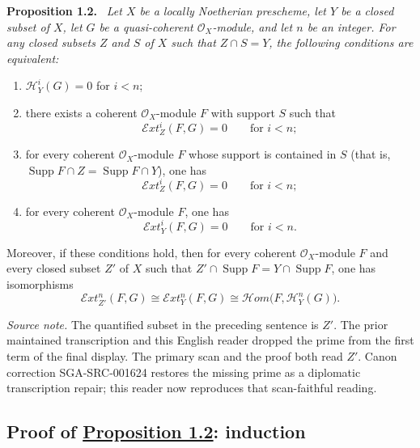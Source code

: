 \documentclass[11pt,a4paper,oneside]{book}
\providecommand{\SheafH}{\mathcal H}
\providecommand{\SheafHom}{\mathcal H\!om}
\providecommand{\SheafExt}{\mathcal E\!xt}
\providecommand{\OX}{\mathcal O_X}
\providecommand{\Supp}{\operatorname{Supp}}
\newenvironment{sgastatement}[1]
  {\par\addvspace{0.8\baselineskip}\noindent\textbf{#1.}\ \itshape}
  {\par\addvspace{0.35\baselineskip}}
\theoremstyle{plain}
\theoremstyle{definition}
\theoremstyle{remark}
\begin{document}
\begin{sgastatement}{Proposition 1.2}
Let $X$ be a locally Noetherian prescheme, let $Y$ be a closed subset of $X$,
let $G$ be a quasi-coherent $\OX$-module, and let $n$ be an integer. For any
closed subsets $Z$ and $S$ of $X$ such that $Z\cap S=Y$, the following
conditions are equivalent:
\begin{enumerate}
  \renewcommand{\labelenumi}{(\roman{enumi})}
  \item $\SheafH_Y^i(G)=0$ for $i<n$;
  \item there exists a coherent $\OX$-module $F$ with support $S$ such that
  \[
    \SheafExt_Z^i(F,G)=0\qquad\text{for }i<n;
  \]
  \item for every coherent $\OX$-module $F$ whose support is contained in $S$
  (that is, $\Supp F\cap Z=\Supp F\cap Y$), one has
  \[
    \SheafExt_Z^i(F,G)=0\qquad\text{for }i<n;
  \]
  \item for every coherent $\OX$-module $F$, one has
  \[
    \SheafExt_Y^i(F,G)=0\qquad\text{for }i<n.
  \]
\end{enumerate}
Moreover, if these conditions hold, then for every coherent $\OX$-module $F$
and every closed subset $Z'$ of $X$ such that
$Z'\cap\Supp F=Y\cap\Supp F$, one has isomorphisms
\[
  \SheafExt_{Z'}^n(F,G)\cong
  \SheafExt_Y^n(F,G)\cong
  \SheafHom\bigl(F,\SheafH_Y^n(G)\bigr).
\]
\end{sgastatement}

\noindent\textit{Source note.} The quantified subset in the preceding
sentence is $Z'$. The prior maintained transcription and this English reader
dropped the prime from the first term of the final display. The primary scan
and the proof both read $Z'$. Canon correction SGA-SRC-001624 restores
the missing prime as a diplomatic transcription repair; this reader now
reproduces that scan-faithful reading.

\subsection*{Proof of \hyperref[VII.1.2]{Proposition 1.2}: induction}
\end{document}
